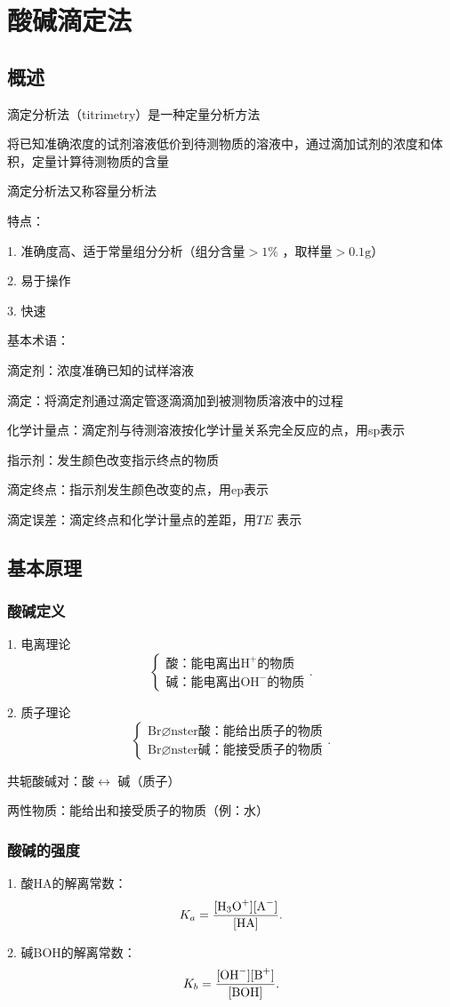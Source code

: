 \section{酸碱滴定法}%
\label{sec:酸碱滴定法}
\subsection{概述}%
\label{sub:概述}
滴定分析法（titrimetry）是一种定量分析方法

\begin{notation}
    将已知准确浓度的试剂溶液低价到待测物质的溶液中，通过滴加试剂的浓度和体积，定量计算待测物质的含量

    滴定分析法又称容量分析法
\end{notation}
特点：

1. 准确度高、适于常量组分分析（组分含量$>1\%$ ，取样量$>0.1\text{g}$）

2. 易于操作

3. 快速

\begin{notation}
    基本术语：

    滴定剂：浓度准确已知的试样溶液

    滴定：将滴定剂通过滴定管逐滴滴加到被测物质溶液中的过程

    化学计量点：滴定剂与待测溶液按化学计量关系完全反应的点，用sp表示

    指示剂：发生颜色改变指示终点的物质

    滴定终点：指示剂发生颜色改变的点，用ep表示

    滴定误差：滴定终点和化学计量点的差距，用$TE$ 表示
\end{notation}
\subsection{基本原理}%
\label{sub:基本原理}
\subsubsection{酸碱定义}%
\label{subsub:酸碱定义}
1. 电离理论
\[
    \begin{cases}
        \text{酸：能电离出}\text{H}^{+} \text{的物质}\\
        \text{碱：能电离出}\text{OH} ^{-}\text{的物质}
    \end{cases}
.\] 

2. 质子理论
\[
    \begin{cases}
    \text{Br}\varnothing\text{nster酸：能给出质子的物质}\\
    \text{Br}\varnothing\text{nster碱：能接受质子的物质}
    \end{cases}
.\] 

\begin{notation}
    共轭酸碱对：酸$\leftrightarrow$ 碱（质子）

    两性物质：能给出和接受质子的物质（例：水）
\end{notation}
\subsubsection{酸碱的强度}%
\label{subsub:酸碱的强度}
1. 酸HA的解离常数： \[
    K_{a}=\frac{[\ce{H_3O+}][\ce{A-}]}{[\text{HA}]}
.\] 

2. 碱BOH的解离常数：
\[
    K_{b}=\frac{[\ce{OH-}][\ce{B+}]}{[\text{BOH}]}
.\] 
